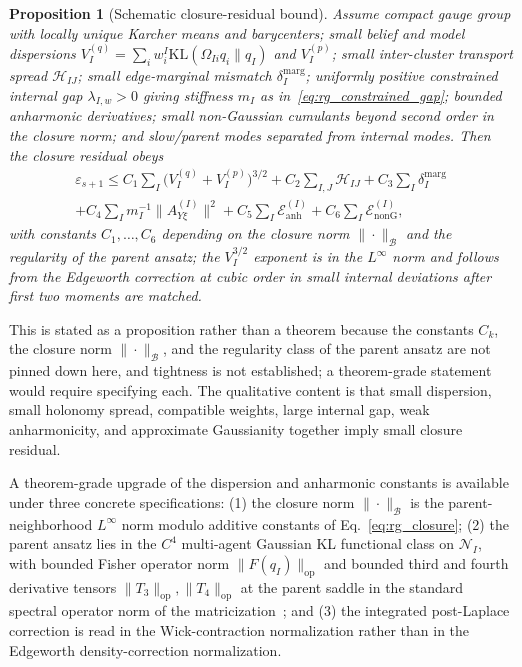 \documentclass[11pt]{article}
\newtheorem{proposition}{Proposition}
\begin{document}
\begin{proposition}[Schematic closure-residual bound]
\label{thm:rg_residual}
Assume compact gauge group with locally unique Karcher means and barycenters; small belief and model dispersions $V_I^{(q)} = \sum_i w_i^I \mathrm{KL}(\Omega_{Ii}q_i \| q_I)$ and $V_I^{(p)}$; small inter-cluster transport spread $\mathcal{H}_{IJ}$; small edge-marginal mismatch $\delta_I^{\mathrm{marg}}$; uniformly positive constrained internal gap $\lambda_{I,w} > 0$ giving stiffness $m_I$ as in~\eqref{eq:rg_constrained_gap}; bounded anharmonic derivatives; small non-Gaussian cumulants beyond second order in the closure norm; and slow/parent modes separated from internal modes. Then the closure residual obeys
\begin{multline}
\varepsilon_{s+1} \le C_1\sum_I \big(V_I^{(q)} + V_I^{(p)}\big)^{3/2} + C_2\sum_{I,J}\mathcal{H}_{IJ} + C_3\sum_I \delta_I^{\mathrm{marg}} \\
 + C_4\sum_I m_I^{-1}\|A_{Y\xi}^{(I)}\|^2 + C_5\sum_I \mathcal{E}_{\mathrm{anh}}^{(I)} + C_6\sum_I \mathcal{E}_{\mathrm{nonG}}^{(I)},
\end{multline}
with constants $C_1, \ldots, C_6$ depending on the closure norm $\|\cdot\|_\mathcal{B}$ and the regularity of the parent ansatz; the $V_I^{3/2}$ exponent is in the $L^\infty$ norm and follows from the Edgeworth correction at cubic order in small internal deviations after first two moments are matched.
\end{proposition}

This is stated as a proposition rather than a theorem because the constants $C_k$, the closure norm $\|\cdot\|_\mathcal{B}$, and the regularity class of the parent ansatz are not pinned down here, and tightness is not established; a theorem-grade statement would require specifying each. The qualitative content is that small dispersion, small holonomy spread, compatible weights, large internal gap, weak anharmonicity, and approximate Gaussianity together imply small closure residual.

A theorem-grade upgrade of the dispersion and anharmonic constants is available under three concrete specifications: (1) the closure norm $\|\cdot\|_\mathcal{B}$ is the parent-neighborhood $L^\infty$ norm modulo additive constants of Eq.~\eqref{eq:rg_closure}; (2) the parent ansatz lies in the $C^4$ multi-agent Gaussian KL functional class on $\mathcal{N}_I$, with bounded Fisher operator norm $\|F(q_I)\|_{\mathrm{op}}$ and bounded third and fourth derivative tensors $\|T_3\|_{\mathrm{op}}, \|T_4\|_{\mathrm{op}}$ at the parent saddle in the standard spectral operator norm of the matricization~\cite{HornJohnson2013}; and (3) the integrated post-Laplace correction is read in the Wick-contraction normalization rather than in the Edgeworth density-correction normalization.
\end{document}
